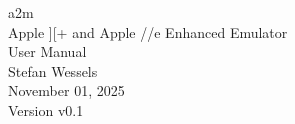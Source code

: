 \begin{titlepage}
  \thispagestyle{empty}
  \centering
  \vspace*{\fill}
  {\Huge a2m}\\[1em]
  {\Large Apple ][+ and Apple //e Enhanced Emulator}\\[1em]
  {\Large User Manual}\\[2em]
  {\large Stefan Wessels}\\[0.5em]
  {\large November 01, 2025}\\[3em]
  {\small Version v0.1}
  \vspace*{\fill}
\end{titlepage}
\clearpage
\tableofcontents
\clearpage